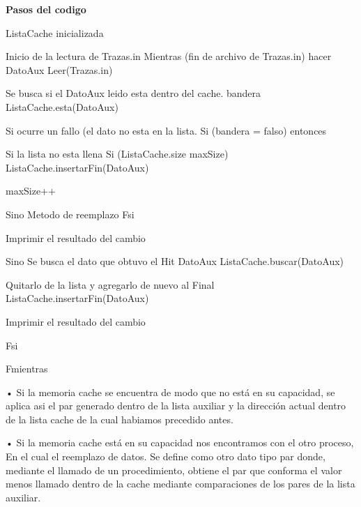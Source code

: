 \documentclass{report}
\begin{document}
\begin{titlepage}
{\bfseries\LARGE  Pasos del codigo 
\par}
	ListaCache inicializada

Inicio de la lectura de Trazas.in
Mientras (fin de archivo de Trazas.in) hacer
	DatoAux \longleftarrow Leer(Trazas.in)
	
		Se busca si el DatoAux leido esta dentro del cache.
	bandera \longleftarrow ListaCache.esta(DatoAux)
	
		Si ocurre un fallo (el dato no esta en la lista.
	Si (bandera = falso) entonces
		
			Si la lista no esta llena
		Si (ListaCache.size \longleftarrow maxSize)
			ListaCache.insertarFin(DatoAux)
		
		\par	maxSize++ \par
		
		Sino
				Metodo de reemplazo 
		Fsi
		
			Imprimir el resultado del cambio
	
	Sino
			Se busca el dato que obtuvo el Hit
		DatoAux \longleftarrow ListaCache.buscar(DatoAux)
	
			Quitarlo de la lista y agregarlo de nuevo al Final
		ListaCache.insertarFin(DatoAux)
		
			Imprimir el resultado del cambio
	
	Fsi

Fmientras


    • Si la memoria cache se encuentra de modo que no está en su capacidad, se aplica asi el par generado dentro de la lista auxiliar y la dirección actual dentro de la lista cache de la cual habiamos precedido antes.
    \par
    • Si la memoria cache está en su capacidad nos encontramos con el otro proceso, En el cual el reemplazo de datos. Se define como otro dato tipo par donde, mediante el llamado de un procedimiento, obtiene el par que conforma el valor menos llamado dentro de la cache mediante comparaciones de los pares de la lista auxiliar.
\end{titlepage}
\end{document}
